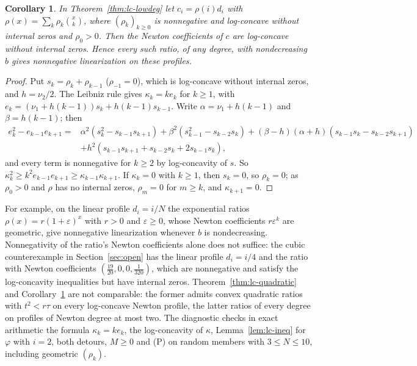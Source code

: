 \documentclass[twoside,10pt]{article}
\numberwithin{equation}{section}
\theoremstyle{slbody}
\newtheorem{corollary}[theorem]{Corollary}
\theoremstyle{definition}
\theoremstyle{remark}
\begin{document}
\begin{corollary}\label{cor:lc-lowdeg}
In Theorem~\ref{thm:lc-lowdeg} let $c_i=\rho(i)d_i$ with $\rho(x)=\sum_k\rho_k\binom xk$, where $(\rho_k)_{k\geq0}$ is nonnegative and log-concave without internal zeros and $\rho_0>0$. Then the Newton coefficients of $c$ are log-concave without internal zeros. Hence every such ratio, of any degree, with nondecreasing $b$ gives nonnegative linearization on these profiles.
\end{corollary}

\begin{proof}
Put $s_k=\rho_k+\rho_{k-1}$ ($\rho_{-1}=0$), which is log-concave without internal zeros, and $h=\nu_2/2$. The Leibniz rule gives $\kappa_k=ke_k$ for $k\geq1$, with $e_k=(\nu_1+h(k-1))s_k+h(k-1)s_{k-1}$. Write $\alpha=\nu_1+h(k-1)$ and $\beta=h(k-1)$; then
\[
\begin{aligned}
e_k^2-e_{k-1}e_{k+1}={}&\alpha^2(s_k^2-s_{k-1}s_{k+1})+\beta^2(s_{k-1}^2-s_{k-2}s_k)+(\beta-h)(\alpha+h)(s_{k-1}s_k-s_{k-2}s_{k+1})\\
&+h^2(s_{k-1}s_{k+1}+s_{k-2}s_k+2s_{k-1}s_k),
\end{aligned}
\]
and every term is nonnegative for $k\geq2$ by log-concavity of $s$. So $\kappa_k^2\geq k^2e_{k-1}e_{k+1}\geq\kappa_{k-1}\kappa_{k+1}$. If $\kappa_k=0$ with $k\geq1$, then $s_k=0$, so $\rho_k=0$; as $\rho_0>0$ and $\rho$ has no internal zeros, $\rho_m=0$ for $m\geq k$, and $\kappa_{k+1}=0$.
\end{proof}

For example, on the linear profile $d_i=i/N$ the exponential ratios $\rho(x)=r(1+\varepsilon)^x$ with $r>0$ and $\varepsilon\geq0$, whose Newton coefficients $r\varepsilon^k$ are geometric, give nonnegative linearization whenever $b$ is nondecreasing. Nonnegativity of the ratio's Newton coefficients alone does not suffice: the cubic counterexample in Section~\ref{sec:open} has the linear profile $d_i=i/4$ and the ratio with Newton coefficients $(\frac{19}{20},0,0,\frac1{320})$, which are nonnegative and satisfy the log-concavity inequalities but have internal zeros. Theorem~\ref{thm:lc-quadratic} and Corollary~\ref{cor:lc-lowdeg} are not comparable: the former admits convex quadratic ratios with $t^2<r\tau$ on every log-concave Newton profile, the latter ratios of every degree on profiles of Newton degree at most two. The diagnostic  checks in exact arithmetic the formula $\kappa_k=ke_k$, the log-concavity of $\kappa$, Lemma~\ref{lem:lc-ineq} for $\varphi$ with $i=2$, both detours, $M\geq0$ and (P) on random members with $3\leq N\leq10$, including geometric $(\rho_k)$.
\end{document}
